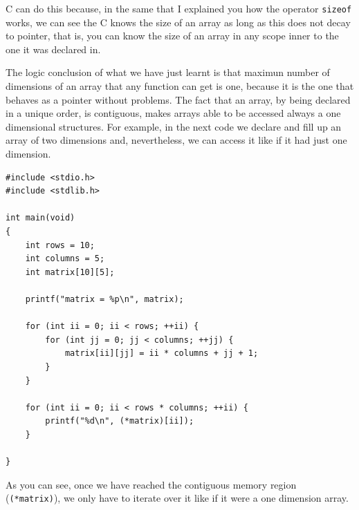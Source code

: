 \documentclass[a4paper]{article}
\begin{document}
C can do this because, in the same that I explained you how the operator
\verb!sizeof! works, we can see the C knows the size of an array as long as this
does not decay to pointer, that is, you can know the size of an array in any
scope inner to the one it was declared in.

The logic conclusion of what we have just learnt is that maximun number of
dimensions of an array that any function can get is one, because it is the one
that behaves as a pointer without problems. The fact that an array, by being
declared in a unique order, is contiguous, makes arrays able to be accessed
always a one dimensional structures. For example, in the next code we declare and
fill up an array of two dimensions and, nevertheless, we can access it like if
it had just one dimension.

\noindent
\begin{minipage}[H]{\linewidth}
\mbox{}
\begin{lstlisting}[style=C,
caption={Using a bidimensional array like a one-dimension structure},
label={lst:bidimensionalArrayAsOneDimension}]
#include <stdio.h>
#include <stdlib.h>

int main(void)
{
    int rows = 10;
    int columns = 5;
    int matrix[10][5];

    printf("matrix = %p\n", matrix);

    for (int ii = 0; ii < rows; ++ii) {
        for (int jj = 0; jj < columns; ++jj) {
            matrix[ii][jj] = ii * columns + jj + 1;
        }
    }

    for (int ii = 0; ii < rows * columns; ++ii) {
        printf("%d\n", (*matrix)[ii]);
    }

}
\end{lstlisting}
\end{minipage}

As you can see, once we have reached the contiguous memory region
(\verb!(*matrix)!), we only have to iterate over it like if it were a one
dimension array.
\end{document}
